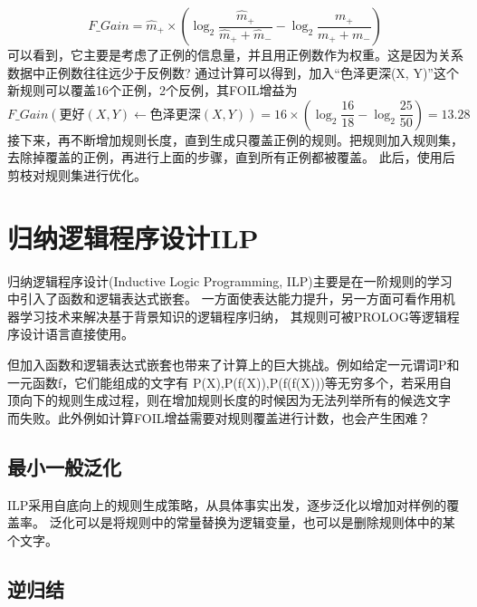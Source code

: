 \documentclass[UTF8]{article}
\begin{document}
    \begin{equation}\label{F_Gain}
        F\_Gain = \hat{m}_+ \times (\log_2{\frac{\hat{m}_+}{\hat{m}_+ + \hat{m}_-}} - \log_2{\frac{m_+}{m_+ + m_-}})
    \end{equation}
    可以看到，它主要是考虑了正例的信息量，并且用正例数作为权重。这是因为关系数据中正例数往往远少于反例数?
    通过计算可以得到，加入“色泽更深(X, Y)”这个新规则可以覆盖16个正例，2个反例，其FOIL增益为
    \begin{equation}
        F\_Gain(\text{更好}(X,Y)\leftarrow \text{色泽更深}(X,Y))=16\times(\log_2{\frac{16}{18}-\log_2{\frac{25}{50}}})=13.28
    \end{equation}
    接下来，再不断增加规则长度，直到生成只覆盖正例的规则。把规则加入规则集，去除掉覆盖的正例，再进行上面的步骤，直到所有正例都被覆盖。
    此后，使用后剪枝对规则集进行优化。
\section{归纳逻辑程序设计ILP}
    归纳逻辑程序设计(Inductive Logic Programming, ILP)主要是在一阶规则的学习中引入了函数和逻辑表达式嵌套。
    一方面使表达能力提升，另一方面可看作用机器学习技术来解决基于背景知识的逻辑程序归纳，
    其规则可被PROLOG等逻辑程序设计语言直接使用。

    但加入函数和逻辑表达式嵌套也带来了计算上的巨大挑战。例如给定一元谓词P和一元函数f，它们能组成的文字有
    P(X),P(f(X)),P(f(f(X)))等无穷多个，若采用自顶向下的规则生成过程，则在增加规则长度的时候因为无法列举所有的候选文字
    而失败。此外例如计算FOIL增益需要对规则覆盖进行计数，也会产生困难？

\subsection{最小一般泛化}
    ILP采用自底向上的规则生成策略，从具体事实出发，逐步泛化以增加对样例的覆盖率。
    泛化可以是将规则中的常量替换为逻辑变量，也可以是删除规则体中的某个文字。

    

\subsection{逆归结}
\end{document}
